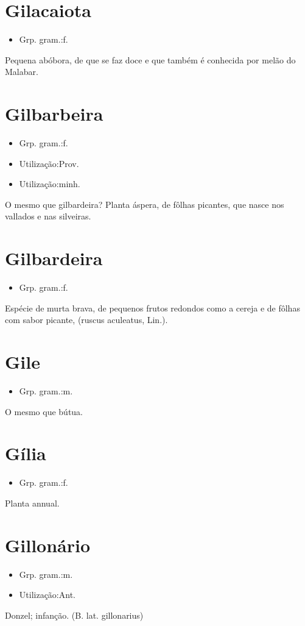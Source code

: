 \section{Gilacaiota}
\begin{itemize}
\item {Grp. gram.:f.}
\end{itemize}
Pequena abóbora, de que se faz doce e que também é conhecida por \textunderscore melão do Malabar\textunderscore .
\section{Gilbarbeira}
\begin{itemize}
\item {Grp. gram.:f.}
\end{itemize}
\begin{itemize}
\item {Utilização:Prov.}
\end{itemize}
\begin{itemize}
\item {Utilização:minh.}
\end{itemize}
O mesmo que \textunderscore gilbardeira\textunderscore ?
Planta áspera, de fôlhas picantes, que nasce nos vallados e nas silveiras.
\section{Gilbardeira}
\begin{itemize}
\item {Grp. gram.:f.}
\end{itemize}
Espécie de murta brava, de pequenos frutos redondos como a cereja e de fôlhas com sabor picante, (\textunderscore ruscus aculeatus\textunderscore , Lin.).
\section{Gile}
\begin{itemize}
\item {Grp. gram.:m.}
\end{itemize}
O mesmo que \textunderscore bútua\textunderscore .
\section{Gília}
\begin{itemize}
\item {Grp. gram.:f.}
\end{itemize}
Planta annual.
\section{Gillonário}
\begin{itemize}
\item {Grp. gram.:m.}
\end{itemize}
\begin{itemize}
\item {Utilização:Ant.}
\end{itemize}
Donzel; infanção.
(B. lat. \textunderscore gillonarius\textunderscore )
